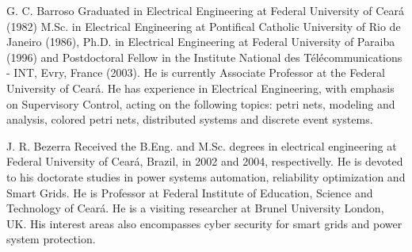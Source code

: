 \documentclass[journal]{IEEEtran}
\begin{document}
\vspace{-0.5in}
\begin{IEEEbiographynophoto}{G. C. Barroso}
  Graduated in Electrical Engineering at Federal University of Ceará (1982) M.Sc. in Electrical Engineering at Pontifical Catholic University of Rio de Janeiro (1986), Ph.D. in Electrical Engineering at Federal University of Paraiba (1996) and Postdoctoral Fellow in the Institute National des Télécommunications - INT, Evry, France (2003). He is currently Associate Professor at the Federal University of Ceará. He has experience in Electrical Engineering, with emphasis on Supervisory Control, acting on the following topics: petri nets, modeling and analysis, colored petri nets, distributed systems and discrete event systems.
\end{IEEEbiographynophoto}
\vspace{-0.5in}
\begin{IEEEbiographynophoto}{J. R. Bezerra}
  Received the B.Eng. and M.Sc. degrees in electrical engineering at Federal University of Ceará, Brazil, in 2002 and 2004, respectivelly. He is devoted to his doctorate studies in power systems automation, reliability optimization and Smart Grids. He is  Professor at Federal Institute of Education, Science and Technology of Ceará. He is a visiting researcher at Brunel University London, UK. His interest areas also encompasses cyber security for smart grids and power system protection.
\end{IEEEbiographynophoto}

\end{document}
